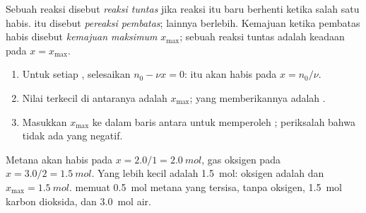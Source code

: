 \begin{definition}\label{def:g10:reaction-progress-table:limiting}
Sebuah reaksi disebut \emph{reaksi tuntas} jika
reaksi itu baru berhenti ketika salah satu  habis. 
itu disebut \emph{pereaksi pembatas}; 
lainnya berlebih. Kemajuan ketika  pembatas habis disebut
\emph{kemajuan maksimum} $x_{\max}$;  sebuah reaksi tuntas adalah keadaan pada $x = x_{\max}$.
\end{definition}

\begin{method}\label{met:g10:reaction-progress-table:limiting}
\begin{enumerate}
  \item Untuk setiap , selesaikan $n_0 - \nu x = 0$:  itu
        akan habis pada $x = n_0 / \nu$.
  \item Nilai terkecil di antaranya adalah $x_{\max}$;  yang
        memberikannya adalah .
  \item Masukkan $x_{\max}$ ke dalam baris antara untuk memperoleh
        ; periksalah bahwa tidak ada  yang negatif.
\end{enumerate}
\end{method}

\begin{example}\label{ex:g10:reaction-progress-table:methane-final}
Metana akan habis pada $x = 2.0/1 = \qty{2.0}{mol}$, gas oksigen pada
$x = 3.0/2 = \qty{1.5}{mol}$. Yang lebih kecil adalah \qty{1.5}{mol}:
oksigen adalah  dan $x_{\max} = \qty{1.5}{mol}$.
 memuat \qty{0.5}{mol} metana yang tersisa, tanpa
oksigen, \qty{1.5}{mol} karbon dioksida, dan \qty{3.0}{mol} air.
\end{example}

